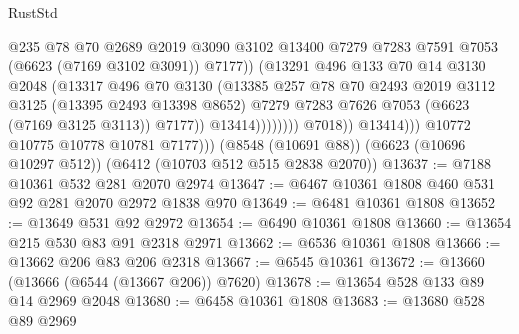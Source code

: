 \begin{lexlean}{RustStd}
\begin{coremodule}
                                      @235
                                      @78
                                      @70
                                      @2689
                                      @2019
                                      @3090
                                      @3102
                                      @13400
                                      @7279
                                      @7283
                                      @7591
                                      @7053
                                      (@6623 (@7169 @3102 @3091))
                                      @7177))
                                  (@13291
                                    @496
                                    @133
                                    @70
                                    @14
                                    @3130
                                    @2048
                                    (@13317
                                      @496
                                      @70
                                      @3130
                                      (@13385
                                        @257
                                        @78
                                        @70
                                        @2493
                                        @2019
                                        @3112
                                        @3125
                                        (@13395 @2493 @13398 @8652)
                                        @7279
                                        @7283
                                        @7626
                                        @7053
                                        (@6623 (@7169 @3125 @3113))
                                        @7177))
                                    @13414))))))))
                    @7018))
                @13414)))
          @10772
          @10775
          @10778
          @10781
          @7177)))
    (@8548 (@10691 @88))
    (@6623 (@10696 @10297 @512))
    (@6412 (@10703 @512 @515 @2838 @2070))
@13637 := @7188 @10361 @532 @281 @2070 @2974
@13647 := @6467 @10361 @1808 @460 @531 @92 @281 @2070 @2972 @1838 @970
@13649 := @6481 @10361 @1808
@13652 := @13649 @531 @92 @2972
@13654 := @6490 @10361 @1808
@13660 := @13654 @215 @530 @83 @91 @2318 @2971
@13662 := @6536 @10361 @1808
@13666 := @13662 @206 @83 @206 @2318
@13667 := @6545 @10361
@13672 := @13660 (@13666 (@6544 (@13667 @206)) @7620)
@13678 := @13654 @528 @133 @89 @14 @2969 @2048
@13680 := @6458 @10361 @1808
@13683 := @13680 @528 @89 @2969

\end{coremodule}
\end{lexlean}
